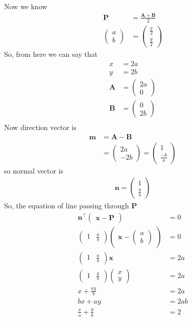 \documentclass[12pt]{article}
\newcommand{\myvec}[1]{\ensuremath{\begin{pmatrix}#1\end{pmatrix}}}
\let\vec\mathbf
\begin{document}
Now we know
\begin{align}
	\vec{P}&=\frac{\vec{A}+\vec{B}}{2}\\
	\myvec{a\\b}&=\myvec{\frac{x}{2}\\\frac{y}{2}}
\end{align}
So, from here we can say that
\begin{align}
	x&=2a\\
	y&=2b\\
	\vec{A} &= \myvec{2a\\0}\\
	\vec{B} &= \myvec{0\\2b}\\
\end{align}
Now direction vector is
\begin{align}
	\vec{m} &= \vec{A}-\vec{B}\\
		&= \myvec{2a\\-2b} = \myvec{1\\\frac{-b}{a}}
\end{align}
so normal vector is
\begin{align}
	\vec{n} = \myvec{1\\\frac{a}{b}}
\end{align}
So, the equation of line passing through $\vec{P}$
\begin{align}
	\vec{n}^{\top} \myvec{\vec{x}-\vec{P}} &= 0\\
	\myvec{1 & \frac{a}{b}}\myvec{\vec{x}-\myvec{a\\b}}&=0\\
	\myvec{1 & \frac{a}{b}}\vec{x}&=2a\\
	\myvec{1 & \frac{a}{b}}\myvec{x\\y}&=2a\\
	x+\frac{ay}{b}&=2a\\
	bx+ay&=2ab\\
	\frac{x}{a}+\frac{y}{b}&=2
\end{align}
\end{document}
